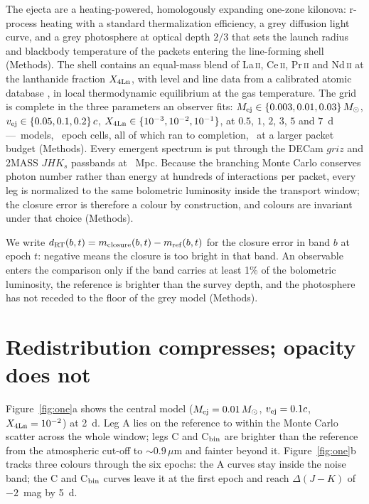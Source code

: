 \documentclass[11pt]{article}
\newcommand{\Cboth}{C\xspace}
\newcommand{\Cbin}{C$_{\rm bin}$\xspace}
\newcommand{\Aleg}{A\xspace}
\newcommand{\dRT}{d_{\rm RT}}
\newcommand{\Xlan}{X_{\rm 4Ln}}
\newcommand{\Mej}{M_{\rm ej}}
\newcommand{\vej}{v_{\rm ej}}
\newcommand{\Msun}{M_\odot}
\newcommand{\LaII}{La\,\textsc{ii}\xspace}
\newcommand{\CeII}{Ce\,\textsc{ii}\xspace}
\newcommand{\PrII}{Pr\,\textsc{ii}\xspace}
\newcommand{\NdII}{Nd\,\textsc{ii}\xspace}
\begin{document}
The ejecta are a heating-powered, homologously expanding one-zone kilonova: r-process heating with a standard thermalization efficiency, a grey diffusion light curve, and a grey photosphere at optical depth $2/3$ that sets the launch radius and blackbody temperature of the packets entering the line-forming shell (Methods). The shell contains an equal-mass blend of \LaII, \CeII, \PrII and \NdII at the lanthanide fraction $\Xlan$, with level and line data from a calibrated atomic database \cite{gsi_atomic,gsi_zenodo}, in local thermodynamic equilibrium at the gas temperature. The grid is complete in the three parameters an observer fits: $\Mej\in\{0.003,0.01,0.03\}\,\Msun$, $\vej\in\{0.05,0.1,0.2\}\,c$, $\Xlan\in\{10^{-3},10^{-2},10^{-1}\}$, at $0.5$, $1$, $2$, $3$, $5$ and $7$~d---\nModels\ models, \nCells\ epoch cells, all of which ran to completion, \nRedone\ at a larger packet budget (Methods). Every emergent spectrum is put through the DECam $griz$ and 2MASS $JHK_s$ passbands \cite{flaugher2015,skrutskie2006,svofps2012,svofps2024} at \Distance\ Mpc. Because the branching Monte Carlo conserves photon number rather than energy at hundreds of interactions per packet, every leg is normalized to the same bolometric luminosity inside the transport window; the closure error is therefore a colour by construction, and colours are invariant under that choice (Methods).  %

We write $\dRT(b,t) = m_{\rm closure}(b,t) - m_{\rm ref}(b,t)$ for the closure error in band $b$ at epoch $t$: negative means the closure is too bright in that band. An observable enters the comparison only if the band carries at least 1\% of the bolometric luminosity, the reference is brighter than the survey depth, and the photosphere has not receded to the floor of the grey model (Methods).

\section{Redistribution compresses; opacity does not}\label{sec:asymmetry}

Figure~\ref{fig:one}a shows the central model ($\Mej=0.01\,\Msun$, $\vej=0.1c$, $\Xlan=10^{-2}$) at 2~d. Leg \Aleg lies on the reference to within the Monte Carlo scatter across the whole window; legs \Cboth and \Cbin are brighter than the reference from the atmospheric cut-off to $\sim0.9\,\mu$m and fainter beyond it. Figure~\ref{fig:one}b tracks three colours through the six epochs: the \Aleg curves stay inside the noise band; the \Cboth and \Cbin curves leave it at the first epoch and reach $\Delta(J-K)$ of $-2$~mag by 5~d.
\end{document}
